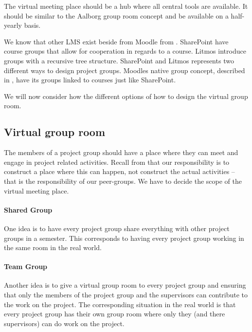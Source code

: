 The virtual meeting place should be a hub where all central tools are available. It should be similar to the Aalborg group room concept and be available on a half-yearly basis.  

We know that other LMS exist beside from Moodle from . 
SharePoint have course groups that allow for cooperation in regards to a course. 
Litmos introduce groups with a recursive tree structure. 
SharePoint and Litmos represents two different ways to design project groups. 
Moodles native group concept, described in , have its groups linked to courses just like SharePoint.   
\\




We will now consider how the different options of how to design the virtual group room.

\subsection{Virtual group room}
The members of a project group should have a place where they can meet and engage in project related activities.
Recall from  that our responsibility is to construct a place where this can happen, not construct the actual activities -- that is the responsibility of our peer-groups.
We have to decide the scope of the virtual meeting place.

\paragraph{Shared Group} One idea is to have every project group share everything with other project groups in a semester.
This corresponds to having every project group working in the same room in the real world.

\paragraph{Team Group} Another idea is to give a virtual group room to every project group and ensuring that only the members of the project group and the supervisors can contribute to the work on the project.
The corresponding situation in the real world is that every project group has their own group room where only they (and there supervisors) can do work on the project. \\

